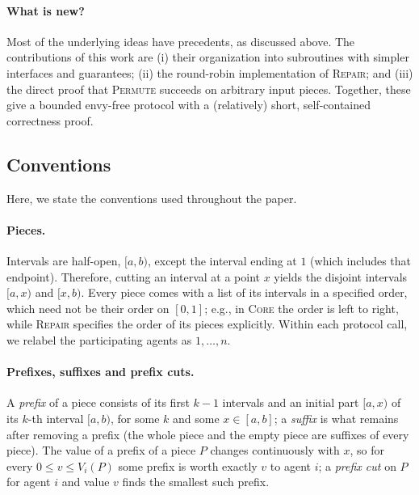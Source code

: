 \documentclass[11pt]{article}
\newcommand{\Core}{\textsc{Core}}
\newcommand{\Repair}{\textsc{Repair}}
\newcommand{\Permute}{\textsc{Permute}}
\theoremstyle{plain}
\theoremstyle{definition}
\theoremstyle{plain}
\begin{document}
\paragraph{What is new?} Most of the underlying ideas have precedents, as discussed above. The contributions of this work are (i) their organization into subroutines with simpler interfaces and guarantees; (ii) the round-robin implementation of \Repair{}; and (iii) the direct proof that \Permute{} succeeds on arbitrary input pieces. Together, these give a bounded envy-free protocol with a (relatively) short, self-contained correctness proof.



\subsection{Conventions}\label{sec:conventions}

Here, we state the conventions used throughout the paper.

\paragraph{Pieces.} Intervals are half-open, $[a,b)$, except the interval ending at $1$ (which includes that endpoint). Therefore, cutting an interval at a point $x$ yields the disjoint intervals $[a,x)$ and $[x,b)$. Every piece comes with a list of its intervals in a specified order, which need not be their order on $[0,1]$; e.g., in \Core{} the order is left to right, while \Repair{} specifies the order of its pieces explicitly. Within each protocol call, we relabel the participating agents as $1,\dots,n$.

\paragraph{Prefixes, suffixes and prefix cuts.} 
A \emph{prefix} of a piece consists of its first $k-1$ intervals and an initial part $[a,x)$ of its $k$-th interval $[a,b)$, for some $k$ and some $x\in[a,b]$; a \emph{suffix} is what remains after removing a prefix (the whole piece and the empty piece are suffixes of every piece). The value of a prefix of a piece $P$ changes continuously with $x$, so for every $0\le v\le V_i(P)$ some prefix is worth exactly $v$ to agent $i$; a \emph{prefix cut} on $P$ for agent $i$ and value $v$ finds the smallest such prefix. 
\end{document}
